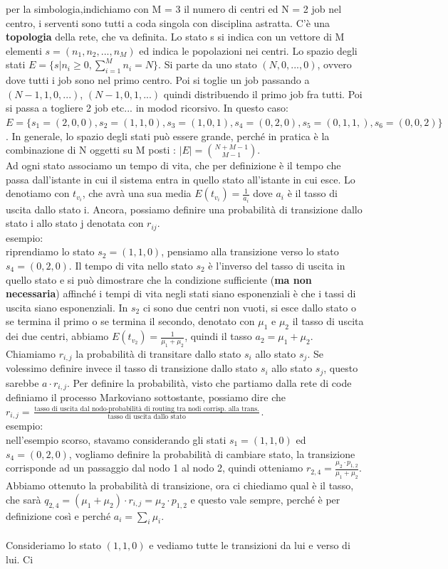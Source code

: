 \documentclass{article}
\begin{document}
per la simbologia,indichiamo con M = 3 il numero di centri ed N = 2 job nel centro, i serventi sono tutti a coda singola con disciplina astratta. C'è una \textbf{topologia} della rete, che va definita. Lo stato s si indica con un vettore di M elementi $s = (n_1, n_2,...,n_M)$ ed indica le popolazioni nei centri. Lo spazio degli stati $E = \{s | n_i \geq 0, \sum\limits_{i=1}^{M} n_i = N\}$. Si parte da uno stato $(N,0,...,0)$, ovvero dove tutti i job sono nel primo centro. Poi si toglie un job passando a $(N-1,1,0,...)$, $(N-1,0,1,...)$ quindi distribuendo il primo job fra tutti. Poi si passa a togliere 2 job etc... in modod ricorsivo. In questo caso: $E = \{ s_1 = (2,0,0), s_2 =(1,1,0), s_3 =(1,0,1), s_4 =(0, 2, 0), s_5 =(0,1,1,), s_6 =(0,0,2)\}$. In generale, lo spazio degli stati può essere grande, perché in pratica è la combinazione di N oggetti su M posti : $|E| = \binom{N+M-1}{M-1}$.\\ Ad ogni stato associamo un tempo di vita, che per definizione è il tempo che passa dall'istante in cui il sistema entra in quello stato all'istante in cui esce. Lo denotiamo con $t_{v_i}$, che avrà una sua media $E(t_{v_i}) = \frac{1}{a_i}$ dove $a_i$ è il tasso di uscita dallo stato i. Ancora, possiamo definire una probabilità di transizione dallo stato i allo stato j denotata con $r_{ij}$.\\ esempio: \\ riprendiamo lo stato $s_2 = (1,1,0)$, pensiamo alla transizione verso lo stato $s_4 = (0,2,0)$. Il tempo di vita nello stato $s_2$ è l'inverso del tasso di uscita in quello stato e si può dimostrare che la condizione sufficiente (\textbf{ma non necessaria}) affinché i tempi di vita negli stati siano esponenziali è che i tassi di uscita siano esponenziali. In $s_2$ ci sono due centri non vuoti, si esce dallo stato o se termina il primo o se termina il secondo, denotato con $\mu_1$ e $\mu_2$ il tasso di uscita dei due centri, abbiamo $E(t_{v_2}) = \frac{1}{\mu_1+\mu_2}$, quindi il tasso $a_2 = \mu_1 + \mu_2$. Chiamiamo $r_{i,j}$ la probabilità di transitare dallo stato $s_i$ allo stato $s_j$. Se volessimo definire invece il tasso di transizione dallo stato $s_i$ allo stato $s_j$, questo sarebbe $a \cdot r_{i,j}$. Per definire la probabilità, visto che partiamo dalla rete di code definiamo il processo Markoviano sottostante, possiamo dire che $r_{i,j} = \frac{\text{tasso di uscita dal nodo}\cdot \text{probabilità di routing tra nodi corrisp. alla trans.}}{\text{tasso di uscita dallo stato}}$.\\ esempio: \\ nell'esempio scorso, stavamo considerando gli stati $s_1 = (1,1,0)$ ed $s_4 = (0,2,0)$, vogliamo definire la probabilità di cambiare stato, la transizione corrisponde ad un passaggio dal nodo 1 al nodo 2, quindi otteniamo $r_{2,4} = \frac{\mu_2 \cdot p_{1,2}}{\mu_1 + \mu_2}$. Abbiamo ottenuto la probabilità di transizione, ora ci chiediamo qual è il tasso, che sarà $q_{2,4} = (\mu_1 + \mu_2) \cdot r_{i, j} = \mu_2 \cdot p_{1,2}$ e questo vale sempre, perché è per definizione così e perché $a_i = \sum\limits_{i} \mu_i$.\\\\ Consideriamo lo stato $(1,1,0)$ e vediamo tutte le transizioni da lui e verso di lui. Ci 
\end{document}

